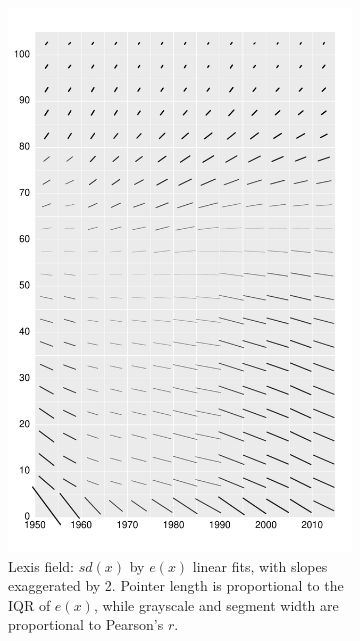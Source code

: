 \documentclass{article}
\begin{document}
\begin{figure}
\begin{subfigure}{.48\textwidth}
  \includegraphics[scale=.38]{Figures/FigApp3.pdf}
  \caption{Lexis field: $sd(x)$ by $e(x)$ linear fits, with slopes exaggerated by 2. Pointer length is proportional to the IQR of $e(x)$, while grayscale and segment width are proportional to Pearson's $r$.}
  \label{fig:sfig3}
\end{subfigure}%
\begin{subfigure}{.48\textwidth}
\captionsetup{width=.8\linewidth}
  \centering

\end{subfigure}
\end{figure}
\end{document}
